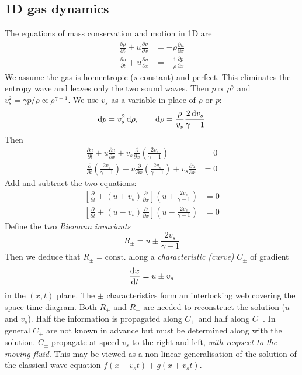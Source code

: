 \documentclass{jknotes}
\begin{document}
\subsection{1D gas dynamics}
The equations of mass conservation and motion in 1D are
\begin{align}
	\frac{\partial \rho}{\partial t} + u \frac{\partial \rho}{\partial x} &= -
\rho \frac{\partial u}{\partial x}\\
	\frac{\partial u}{\partial t} + u \frac{\partial u}{\partial x} &= -
	\frac{1}{\rho}\frac{\partial p}{\partial x}
\end{align}
We assume the gas is homentropic ($s$ constant) and perfect. This eliminates
the entropy wave and leaves only the two sound waves. Then $p \propto
\rho^\gamma$ and $v_s^2 = \gamma p/\rho \propto \rho^{\gamma -1}$. We use
$v_s$ as a variable in place of $\rho$ or $p$:
\begin{equation}
	\diffd p = v_s^2\, \diffd \rho, \hspace{2em} \diffd \rho = \frac{\rho}{v_s}
	\frac{2 \,\diffd v_s}{\gamma -1}
\end{equation}
Then
\begin{align}
	\frac{\partial u}{\partial t} + u \frac{\partial u}{\partial x} + v_s
	\frac{\partial}{\partial x}\left(\frac{2
v_s}{\gamma-1}\right)&= 0 \\
\frac{\partial}{\partial t}\left(\frac{2v_s}{\gamma -1}\right) +
u\frac{\partial}{\partial x}\left(\frac{2v_s}{\gamma -1}\right) + v_s
\frac{\partial u}{\partial x} &= 0
\end{align}
Add and subtract the two equations:
\begin{align}
	\left[ \frac{\partial}{\partial t} + (u+v_s)\frac{\partial}{\partial x}
	\right] \left( u + \frac{ 2 v_s}{\gamma -1}\right) &= 0 \\
	\left[ \frac{\partial}{\partial t} + (u-v_s)\frac{\partial}{\partial x}
	\right] \left( u - \frac{ 2 v_s}{\gamma -1}\right) &= 0 
\end{align}
Define the two \emph{Riemann invariants}
\begin{equation}
	R_\pm = u \pm \frac{2 v_s}{\gamma -1}
\end{equation}
Then we deduce that $R_\pm = \text{const.}$ along a \emph{characteristic
(curve)} $C_\pm$ of gradient
\begin{equation}
	\frac{\diffd x}{\diffd t} = u \pm v_s
\end{equation}
in the $(x,t)$ plane. The $\pm$ characteristics form an interlocking web
covering the space-time diagram. Both $R_+$ and $R_-$ are needed to
reconstruct the solution ($u$ and $v_s$). Half the information is propagated
along $C_+$ and half along $C_-$. In general $C_\pm$ are not known in advance
but must be determined along with the solution. $C_\pm$ propagate at speed
$v_s$ to the right and left, \emph{with respsect to the moving fluid}. This
may be viewed as a non-linear generalisation of the solution of the
classical wave equation $f(x-v_st) + g(x+v_s t)$.
\end{document}
